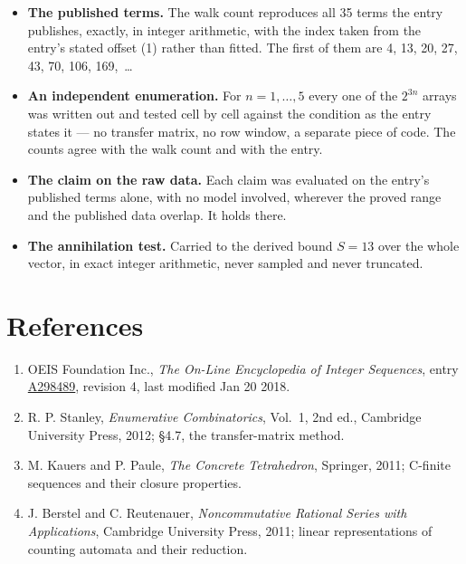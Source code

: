 \documentclass[11pt]{article}
\theoremstyle{definition}
\begin{document}
\begin{itemize}

\item {\bfseries The published terms.} The walk count reproduces all 35 terms the entry publishes, exactly, in integer arithmetic, with the index taken from the entry's stated offset (1) rather than fitted. The first of them are 4, 13, 20, 27, 43, 70, 106, 169,~\dots

\item {\bfseries An independent enumeration.} For $n = 1,\dots,5$ every one of the $2^{3n}$ arrays was written out and tested cell by cell against the condition as the entry states it --- no transfer matrix, no row window, a separate piece of code. The counts agree with the walk count and with the entry.

\item {\bfseries The claim on the raw data.} Each claim was evaluated on the entry's published terms alone, with no model involved, wherever the proved range and the published data overlap. It holds there.

\item {\bfseries The annihilation test.} Carried to the derived bound $S = 13$ over the whole vector, in exact integer arithmetic, never sampled and never truncated.

\end{itemize}

\section{References}

\begin{enumerate}

\item OEIS Foundation Inc., \emph{The On-Line Encyclopedia of Integer Sequences}, entry \href{https://oeis.org/A298489}{A298489}, revision 4, last modified Jan 20 2018.

\item R. P. Stanley, \emph{Enumerative Combinatorics}, Vol.~1, 2nd ed., Cambridge University Press, 2012; \S4.7, the transfer-matrix method.

\item M. Kauers and P. Paule, \emph{The Concrete Tetrahedron}, Springer, 2011; C-finite sequences and their closure properties.

\item J. Berstel and C. Reutenauer, \emph{Noncommutative Rational Series with Applications}, Cambridge University Press, 2011; linear representations of counting automata and their reduction.

\end{enumerate}
\end{document}
